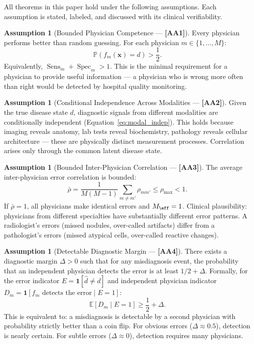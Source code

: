 \documentclass[11pt,a4paper]{article}
\theoremstyle{definition}
\newtheorem{assumption}[theorem]{Assumption}
\DeclareMathOperator{\Sens}{Sens}
\DeclareMathOperator{\Spec}{Spec}
\newcommand{\E}{\mathbb{E}}
\newcommand{\Pbb}{\mathbb{P}}
\newcommand{\ind}[1]{\mathbf{1}[#1]}
\newcommand{\assumptionTag}[1]{\textsf{\textbf{[A#1]}}}
\newcommand{\disease}{d}                       %
\newcommand{\diagnosis}{\hat{d}}               %
\begin{document}
All theorems in this paper hold under the following assumptions. Each
assumption is stated, labeled, and discussed with its clinical verifiability.

\begin{assumption}[Bounded Physician Competence --- \assumptionTag{A1}]
\label{ass:A1}
Every physician performs better than random guessing. For each physician
$m \in \{1, \dots, M\}$:
\begin{equation}\label{eq:A1}
    \Pbb(f_m(\mathbf{x}) = \disease) > \frac{1}{2}.
\end{equation}
Equivalently, $\Sens_m + \Spec_m > 1$. This is the minimal requirement for
a physician to provide useful information --- a physician who is wrong more
often than right would be detected by hospital quality monitoring.
\end{assumption}

\begin{assumption}[Conditional Independence Across Modalities --- \assumptionTag{A2}]
\label{ass:A2}
Given the true disease state $\disease$, diagnostic signals from different
modalities are conditionally independent (Equation~\ref{eq:modal_indep}).
This holds because imaging reveals anatomy, lab tests reveal biochemistry,
pathology reveals cellular architecture --- these are physically distinct
measurement processes. Correlation arises only through the common latent
disease state.
\end{assumption}

\begin{assumption}[Bounded Inter-Physician Correlation --- \assumptionTag{A3}]
\label{ass:A3}
The average inter-physician error correlation is bounded:
\begin{equation}\label{eq:A3}
    \bar{\rho} = \frac{1}{M(M-1)}\sum_{m \neq m'} \rho_{mm'} \le \rho_{\max} < 1.
\end{equation}
If $\bar{\rho} = 1$, all physicians make identical errors and $M_{\eff} = 1$.
Clinical plausibility: physicians from different specialties have substantially
different error patterns. A radiologist's errors (missed nodules, over-called
artifacts) differ from a pathologist's errors (missed atypical cells, over-called
reactive changes).
\end{assumption}

\begin{assumption}[Detectable Diagnostic Margin --- \assumptionTag{A4}]
\label{ass:A4}
There exists a diagnostic margin $\Delta > 0$ such that for any misdiagnosis
event, the probability that an independent physician detects the error is
at least $1/2 + \Delta$. Formally, for the error indicator
$E = \ind{\diagnosis \neq \disease}$ and independent physician indicator
$D_m = \ind{f_m \text{ detects the error} \mid E = 1}$:
\begin{equation}\label{eq:A4}
    \E[D_m \mid E = 1] \ge \frac{1}{2} + \Delta.
\end{equation}
This is equivalent to: a misdiagnosis is detectable by a second physician
with probability strictly better than a coin flip. For obvious errors
($\Delta \approx 0.5$), detection is nearly certain. For subtle errors
($\Delta \approx 0$), detection requires many physicians.
\end{assumption}
\end{document}
